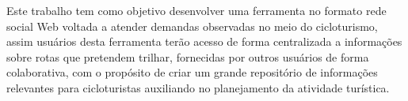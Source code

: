 Este trabalho tem como objetivo desenvolver uma ferramenta no formato rede social Web voltada a atender demandas observadas no meio do cicloturismo,
assim usuários desta ferramenta terão acesso de forma centralizada a informações sobre rotas que pretendem trilhar, fornecidas por outros usuários
de forma colaborativa, com o propósito de criar um grande repositório de informações relevantes para cicloturistas auxiliando no planejamento da 
atividade turística.